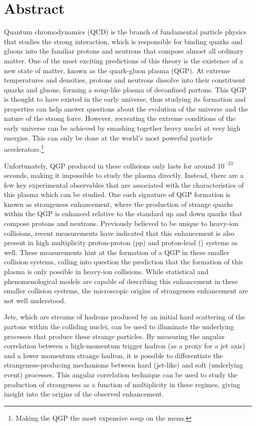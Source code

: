 \chapter{Abstract}

Quantum chromodynamics (QCD) is the branch of fundamental particle physics that studies the strong interaction, which is responsible for binding quarks and gluons into the familiar protons and neutrons that compose almost all ordinary matter. One of the most exciting predictions of this theory is the existence of a new state of matter, known as the quark-gluon plasma (QGP). At extreme temperatures and densities, protons and neutrons dissolve into their constituent quarks and gluons, forming a soup-like plasma of deconfined partons. This QGP is thought to have existed in the early universe, thus studying its formation and properties can help answer questions about the evolution of the universe and the nature of the strong force. However, recreating the extreme conditions of the early universe can be achieved by smashing together heavy nuclei at very high energies. This can only be done at the world's most powerful particle accelerators.\footnote{Making the QGP the most expensive soup on the menu.}

Unfortunately, QGP produced in these collisions only lasts for around $10^{-23}$ seconds, making it impossible to study the plasma directly. Instead, there are a few key experimental observables that are associated with the characteristics of this plasma which can be studied. One such signature of QGP formation is known as strangeness enhancement, where the production of strange quarks within the QGP is enhanced relative to the standard up and down quarks that compose protons and neutrons. Previously believed to be unique to heavy-ion collisions, recent measurements have indicated that this enhancement is also present in high multiplicity proton-proton (pp) and proton-lead (\pPb) systems as well. These measurements hint at the formation of a QGP in these smaller collision systems, calling into question the prediction that the formation of this plasma is only possible in heavy-ion collisions. While statistical and phenomenological models are capable of describing this enhancement in these smaller collision systems, the microscopic origins of strangeness enhancement are not well understood.

Jets, which are streams of hadrons produced by an initial hard scattering of the partons within the colliding nuclei, can be used to illuminate the underlying processes that produce these strange particles. By measuring the angular correlation between a high-momentum trigger hadron (as a proxy for a jet axis) and a lower momentum strange hadron, it is possible to differentiate the strangeness-producing mechanisms between hard (jet-like) and soft (underlying event) processes. This angular correlation technique can be used to study the production of strangeness as a function of multiplicity in these regimes, giving insight into the origins of the observed enhancement. 

